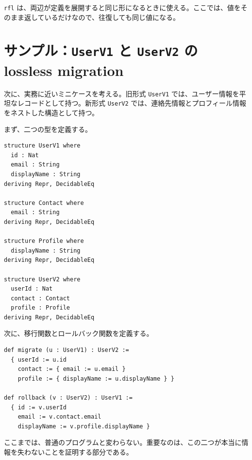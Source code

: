 \texttt{rfl} は、両辺が定義を展開すると同じ形になるときに使える。ここでは、値をそのまま返しているだけなので、往復しても同じ値になる。

\section{サンプル：\texttt{UserV1} と \texttt{UserV2} の lossless migration}
\label{sec:ch06-user-migration}

次に、実務に近いミニケースを考える。旧形式 \texttt{UserV1} では、ユーザー情報を平坦なレコードとして持つ。新形式 \texttt{UserV2} では、連絡先情報とプロフィール情報をネストした構造として持つ。


まず、二つの型を定義する。

\begin{listing}[htbp]
\begin{verbatim}
structure UserV1 where
  id : Nat
  email : String
  displayName : String
deriving Repr, DecidableEq

structure Contact where
  email : String
deriving Repr, DecidableEq

structure Profile where
  displayName : String
deriving Repr, DecidableEq

structure UserV2 where
  userId : Nat
  contact : Contact
  profile : Profile
deriving Repr, DecidableEq
\end{verbatim}
\caption{旧ユーザー型と新ユーザー型}
\label{lst:ch06_user_types}
\end{listing}

次に、移行関数とロールバック関数を定義する。

\begin{listing}[htbp]
\begin{verbatim}
def migrate (u : UserV1) : UserV2 :=
  { userId := u.id
    contact := { email := u.email }
    profile := { displayName := u.displayName } }

def rollback (v : UserV2) : UserV1 :=
  { id := v.userId
    email := v.contact.email
    displayName := v.profile.displayName }
\end{verbatim}
\caption{移行関数とロールバック関数}
\label{lst:ch06_user_functions}
\end{listing}

ここまでは、普通のプログラムと変わらない。重要なのは、この二つが本当に情報を失わないことを証明する部分である。

